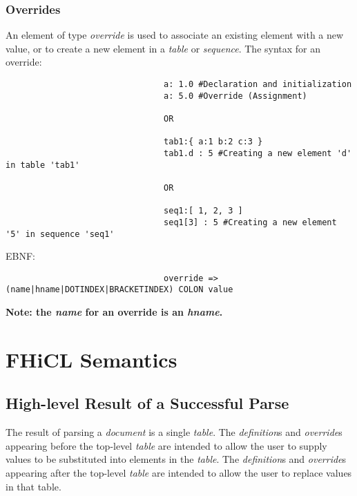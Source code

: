 \documentclass{article}
\begin{document}
                \subsubsection{Overrides}
                        An element of type \emph{override} is used to associate 
                        an existing element with a new value,
                        or to create a new element in a \emph{table} or \emph{sequence}.
                        The syntax for an override:
                        \begin{verbatim}
                                a: 1.0 #Declaration and initialization
                                a: 5.0 #Override (Assignment)
                                
                                OR
                                
                                tab1:{ a:1 b:2 c:3 }
                                tab1.d : 5 #Creating a new element 'd' in table 'tab1'
                                
                                OR
                                
                                seq1:[ 1, 2, 3 ]
                                seq1[3] : 5 #Creating a new element '5' in sequence 'seq1'
                        \end{verbatim}
                        \vspace{1mm}
                        EBNF:
                        \begin{verbatim}
                                override => (name|hname|DOTINDEX|BRACKETINDEX) COLON value
                        \end{verbatim}  
                        \bf Note: \rm the \emph{name} for an override 
                        is an \emph{hname}.
                        
\section{FHiCL Semantics}
        \subsection{High-level Result of a Successful Parse}
                The result of parsing a \emph{document}
                is a single \emph{table}.
                The \emph{definition}s and \emph{override}s
                appearing before the top-level \emph{table}
                are intended to allow the user
                to supply values to be substituted into elements in the \emph{table}.
                The \emph{definition}s and \emph{override}s
                appearing after the top-level \emph{table}
                are intended to allow the user
                to replace values in that table.
\end{document}
